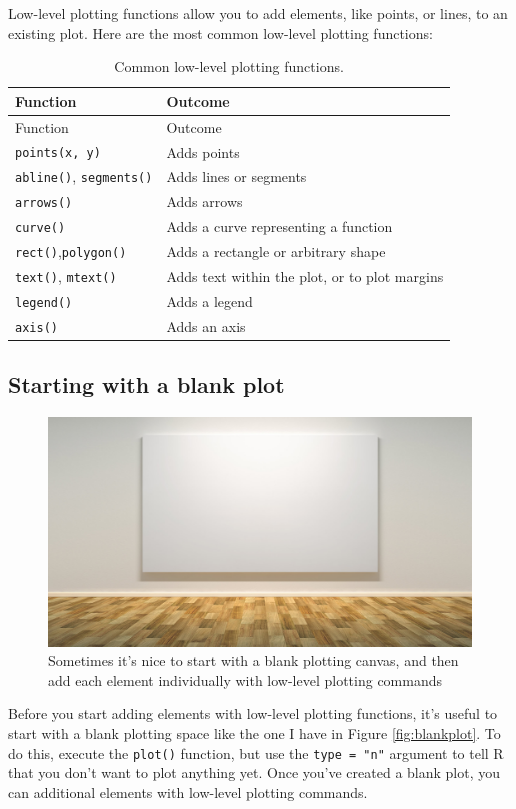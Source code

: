\documentclass[]{book}
\theoremstyle{definition}
\theoremstyle{definition}
\theoremstyle{remark}
\begin{document}
Low-level plotting functions allow you to add elements, like points, or
lines, to an existing plot. Here are the most common low-level plotting
functions:

\begin{longtable}[]{@{}ll@{}}
\caption{\label{tab:lowlevelplotting} Common low-level plotting
functions.}\tabularnewline
\toprule
Function & Outcome\tabularnewline
\midrule
\endfirsthead
\toprule
Function & Outcome\tabularnewline
\midrule
\endhead
\texttt{points(x,\ y)} & Adds points\tabularnewline
\texttt{abline()}, \texttt{segments()} & Adds lines or
segments\tabularnewline
\texttt{arrows()} & Adds arrows\tabularnewline
\texttt{curve()} & Adds a curve representing a function\tabularnewline
\texttt{rect()},\texttt{polygon()} & Adds a rectangle or arbitrary
shape\tabularnewline
\texttt{text()}, \texttt{mtext()} & Adds text within the plot, or to
plot margins\tabularnewline
\texttt{legend()} & Adds a legend\tabularnewline
\texttt{axis()} & Adds an axis\tabularnewline
\bottomrule
\end{longtable}

\subsection{Starting with a blank
plot}\label{starting-with-a-blank-plot}

\begin{figure}

{\centering \includegraphics[width=0.75\linewidth]{images/canvas} 

}

\caption{Sometimes it's nice to start with a blank plotting canvas, and then add each element individually with low-level plotting commands}\label{fig:canvas}
\end{figure}

Before you start adding elements with low-level plotting functions, it's
useful to start with a blank plotting space like the one I have in
Figure \ref{fig:blankplot}. To do this, execute the \texttt{plot()}
function, but use the \texttt{type\ =\ "n"} argument to tell R that you
don't want to plot anything yet. Once you've created a blank plot, you
can additional elements with low-level plotting commands.
\end{document}
